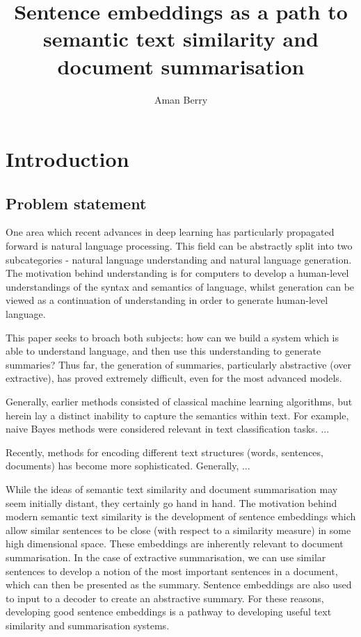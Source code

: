 \documentclass[a4 paper, 12pt]{article}
\title{Sentence embeddings as a path to semantic text similarity and document summarisation}
\author{Aman Berry}
\date{}
\begin{document}
\maketitle

\section{Introduction}

\subsection{Problem statement}

One area which recent advances in deep learning has particularly propagated forward is natural language processing. This field can be abstractly split into two subcategories - natural language understanding and natural language generation. The motivation behind understanding is for computers to develop a human-level understandings of the syntax and semantics of language, whilst generation can be viewed as a continuation of understanding in order to generate human-level language. 

This paper seeks to broach both subjects: how can we build a system which is able to understand language, and then use this understanding to generate summaries? Thus far, the generation of summaries, particularly abstractive (over extractive), has proved extremely difficult, even for the most advanced models. 

Generally, earlier methods consisted of classical machine learning algorithms, but herein lay a distinct inability to capture the semantics within text. For example, naive Bayes methods were considered relevant in text classification tasks. ...

Recently, methods for encoding different text structures (words, sentences, documents) has become more sophisticated. Generally, ...

While the ideas of semantic text similarity and document summarisation may seem initially distant, they certainly go hand in hand. The motivation behind modern semantic text similarity is the development of sentence embeddings which allow similar sentences to be close (with respect to a similarity measure) in some high dimensional space. These embeddings are inherently relevant to document summarisation. In the case of extractive summarisation, we can use similar sentences to develop a notion of the most important sentences in a document, which can then be presented as the summary. Sentence embeddings are also used to input to a decoder to create an abstractive summary. For these reasons, developing good sentence embeddings is a pathway to developing useful text similarity and summarisation systems.
\end{document}
